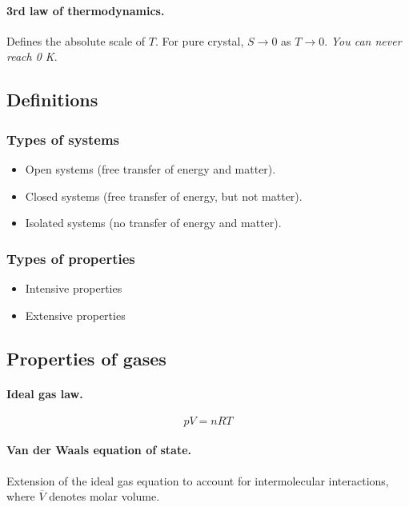 \documentclass{article}
\numberwithin{theorem}{section}
\numberwithin{corollary}{section}
\numberwithin{postulate}{section}
\numberwithin{lemma}{section}
\numberwithin{definition}{section}
\begin{document}
\paragraph{3rd law of thermodynamics.} Defines the absolute scale of $T$. For
pure crystal, $S \rightarrow 0$ as $T \rightarrow 0$. \textit{You can never
reach 0 K}.

\subsection{Definitions}

\subsubsection{Types of systems}
\begin{itemize}
  \item Open systems (free transfer of energy and matter).
  \item Closed systems (free transfer of energy, but not matter).
  \item Isolated systems (no transfer of energy and matter).
\end{itemize}

\subsubsection{Types of properties}
\begin{itemize}
  \item{Intensive properties}
  \item{Extensive properties}
\end{itemize}


\subsection{Properties of gases}

\paragraph{Ideal gas law. }
\begin{equation}
  pV = nRT
\end{equation}

\paragraph{Van der Waals equation of state.} Extension of the ideal gas equation
to account for intermolecular interactions, where $\overline{V}$ denotes molar
volume. 
\end{document}
